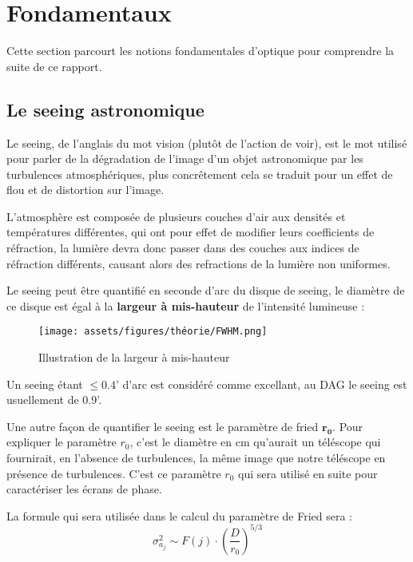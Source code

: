 \section{Fondamentaux}
Cette section parcourt les notions fondamentales d'optique pour comprendre la suite de ce rapport.

\subsection{Le seeing astronomique}
Le seeing, de l'anglais du mot vision (plutôt de l'action de voir), est le mot utilisé pour parler de la dégradation de l'image
d'un objet astronomique par les turbulences atmosphériques, plus concrêtement cela se traduit pour un effet de flou et de distortion sur l'image.

L'atmosphère est composée de plusieurs couches d'air aux densités et températures différentes, qui ont pour effet de modifier leurs coefficients de réfraction, la lumière devra donc passer
dans des couches aux indices de réfraction différents, causant alors des refractions de la lumière non uniformes.

Le seeing peut être quantifié en seconde d'arc du disque de seeing, le diamètre de ce disque est égal à la \textbf{largeur à mis-hauteur} de l'intensité lumineuse :
\begin{figure}[H]
  \centering
  \texttt{[image: assets/figures/théorie/FWHM.png]}
  \caption[Illustration de la LMH]{Illustration de la largeur à mis-hauteur \autocite{largeur_mis_hauteur}\footnotemark}\label{fig:largeur_mis_hauteur}
\end{figure}

Un seeing étant $\leq  0.4$' d'arc est considéré comme excellant, au DAG le seeing est usuellement de 0.9'.

Une autre façon de quantifier le seeing est le paramètre de fried $\mathbf{r_0}$. Pour expliquer le paramètre $r_0$, c'est le diamètre en cm qu'aurait un téléscope
qui fournirait, en l'absence de turbulences, la même image que notre téléscope en présence de turbulences. C'est ce paramètre $r_0$ qui sera utilisé en suite pour caractériser les écrans de phase.

La formule qui sera utilisée dans le calcul du paramètre de Fried sera :
\begin{equation}
  \sigma_{a_j}^2 \sim F(j) \cdot (\frac{D}{r_0})^{5/3}
\end{equation}

